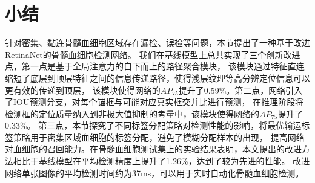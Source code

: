 \section{小结}
针对密集、黏连骨髓血细胞区域存在漏检、误检等问题，本节提出了一种基于改进RetinaNet的骨髓血细胞检测网络。
我们在基线模型上总共实现了三个创新改进点，第一点是基于全局注意力的自下而上的路径聚合模块，
该模块通过特征直连缩短了底层到顶层特征之间的信息传递路径，使得浅层纹理等高分辨定位信息可以更有效的传递到顶层，
该模块使得网络的$AP_{75}$提升了0.59\%。第二点，网络引入了IOU预测分支，对每个锚框与可能对应真实框交并比进行预测，
在推理阶段将检测框的定位质量纳入到非极大值抑制的考量中，该模块使得网络的$AP_{75}$提升了0.33\%。
第三点，本节探究了不同标签分配策略对检测性能的影响，将最优输运标签策略用于密集区域血细胞的标签分配，避免了模糊分配样本的出现，
提高网络对血细胞的召回能力。在骨髓血细胞测试集上的实验结果表明，本文提出的改进方法相比于基线模型在平均检测精度上提升了1.26\%，达到了较为先进的性能。
改进网络单张图像的平均检测时间约为37ms，可以用于实时自动化骨髓血细胞检测。



